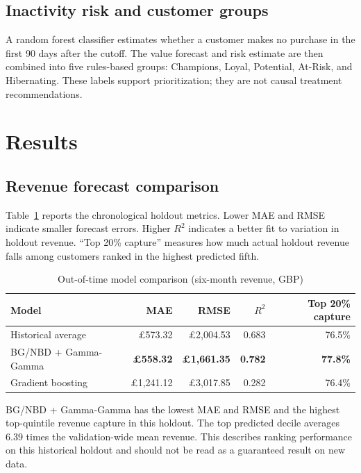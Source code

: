 \documentclass[11pt,a4paper]{article}
\newcommand{\GBP}{\pounds}
\begin{document}
\subsection{Inactivity risk and customer groups}

A random forest classifier estimates whether a customer makes no purchase in
the first 90 days after the cutoff. The value forecast and risk estimate are
then combined into five rules-based groups: Champions, Loyal, Potential,
At-Risk, and Hibernating. These labels support prioritization; they are not
causal treatment recommendations.

\section{Results}

\subsection{Revenue forecast comparison}

Table~\ref{tab:model-results} reports the chronological holdout metrics. Lower
MAE and RMSE indicate smaller forecast errors. Higher $R^2$ indicates a better
fit to variation in holdout revenue. ``Top 20\% capture'' measures how much
actual holdout revenue falls among customers ranked in the highest predicted
fifth.

\begin{table}[H]
\centering
\caption{Out-of-time model comparison (six-month revenue, GBP)}
\label{tab:model-results}
\begin{tabular}{@{}lrrrr@{}}
\toprule
\textbf{Model} & \textbf{MAE} & \textbf{RMSE} & \textbf{$R^2$} & \textbf{Top 20\% capture}\\
\midrule
Historical average & \GBP 573.32 & \GBP 2,004.53 & 0.683 & 76.5\%\\
BG/NBD + Gamma-Gamma & \textbf{\GBP 558.32} & \textbf{\GBP 1,661.35} & \textbf{0.782} & \textbf{77.8\%}\\
Gradient boosting & \GBP 1,241.12 & \GBP 3,017.85 & 0.282 & 76.4\%\\
\bottomrule
\end{tabular}
\end{table}

BG/NBD + Gamma-Gamma has the lowest MAE and RMSE and the highest top-quintile
revenue capture in this holdout. The top predicted decile averages 6.39 times
the validation-wide mean revenue. This describes ranking performance on this
historical holdout and should not be read as a guaranteed result on new data.
\end{document}
